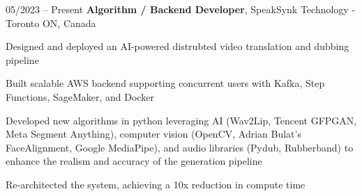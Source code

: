 \begin{twocolentry}{
    05/2023 – Present
}
\fontsize{11 pt}{11 pt}\textbf{Algorithm / Backend Developer}, SpeakSynk Technology - Toronto ON, Canada\end{twocolentry}

\vspace{0.10 cm}
\begin{onecolentry}
    \begin{highlights}
        \item Designed and deployed an AI-powered distrubted video translation and dubbing pipeline
        \item Built scalable AWS backend supporting concurrent users with Kafka, Step Functions, SageMaker, and Docker
        \item Developed new algorithms in python leveraging AI (Wav2Lip, Tencent GFPGAN, Meta Segment Anything), computer vision (OpenCV, Adrian Bulat’s FaceAlignment, Google MediaPipe), and audio libraries (Pydub, Rubberband) to enhance the realism and accuracy of the generation pipeline 
        \item Re-architected the system, achieving a 10x reduction in compute time
    \end{highlights}
\end{onecolentry}
